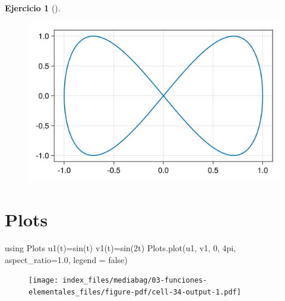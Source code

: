 \documentclass[
  a4paper,
]{scrreport}
\newenvironment{Shaded}{\begin{snugshade}}{\end{snugshade}}
\newcommand{\BuiltInTok}[1]{\textcolor[rgb]{0.00,0.23,0.31}{#1}}
\newcommand{\ConstantTok}[1]{\textcolor[rgb]{0.56,0.35,0.01}{#1}}
\newcommand{\FloatTok}[1]{\textcolor[rgb]{0.68,0.00,0.00}{#1}}
\newcommand{\FunctionTok}[1]{\textcolor[rgb]{0.28,0.35,0.67}{#1}}
\newcommand{\ImportTok}[1]{\textcolor[rgb]{0.00,0.46,0.62}{#1}}
\newcommand{\NormalTok}[1]{\textcolor[rgb]{0.00,0.23,0.31}{#1}}
\newcommand{\OperatorTok}[1]{\textcolor[rgb]{0.37,0.37,0.37}{#1}}
\theoremstyle{definition}
\newtheorem{exercise}{Ejercicio}[chapter]
\theoremstyle{remark}
\begin{document}
\begin{exercise}[]
\begin{tcolorbox}
\begin{figure}[H]

{\centering \includegraphics{03-funciones-elementales_files/figure-pdf/cell-33-output-1.png}

}

\end{figure}

\section{Plots}

\begin{Shaded}
\begin{Highlighting}[]
\ImportTok{using} \BuiltInTok{Plots}
\FunctionTok{u1}\NormalTok{(t)}\OperatorTok{=}\FunctionTok{sin}\NormalTok{(t)}
\FunctionTok{v1}\NormalTok{(t)}\OperatorTok{=}\FunctionTok{sin}\NormalTok{(}\FloatTok{2}\NormalTok{t)}
\NormalTok{Plots.}\FunctionTok{plot}\NormalTok{(u1, v1, }\FloatTok{0}\NormalTok{, }\FloatTok{4}\NormalTok{pi, aspect\_ratio}\OperatorTok{=}\FloatTok{1.0}\NormalTok{, legend }\OperatorTok{=} \ConstantTok{false}\NormalTok{)}
\end{Highlighting}
\end{Shaded}

\begin{figure}[H]

{\centering \texttt{[image: index\_files/mediabag/03-funciones-elementales\_files/figure-pdf/cell-34-output-1.pdf]}

}

\end{figure}

\end{tcolorbox}

\end{exercise}
\end{document}
